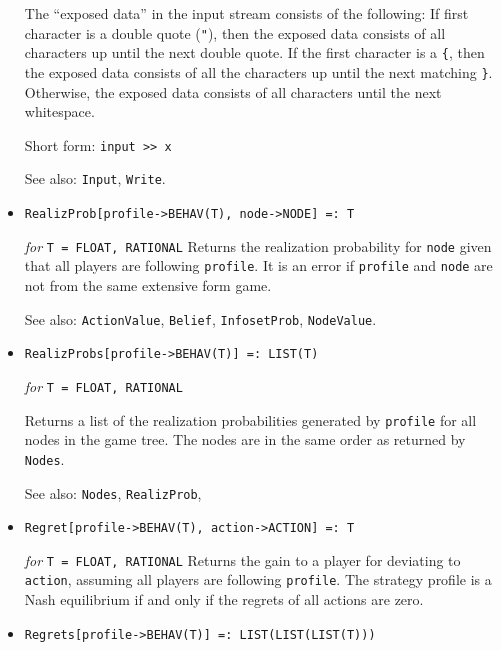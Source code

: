 \begin{itemize}
The ``exposed data'' in the input stream consists of the following: If
first character is a double quote (\verb+"+), then the exposed data
consists of all characters up until the next double quote.  If the
first character is a \verb+{+, then the exposed data consists of all
the characters up until the next matching \verb+}+.  Otherwise, the
exposed data consists of all characters until the next whitespace.
\item [Short form:] \verb+input >> x+
\item [See also:] \verb+Input+, \verb+Write+.
\ed

\item{}
\protect \large \begin{verbatim}
RealizProb[profile->BEHAV(T), node->NODE] =: T
\end{verbatim}\normalsize

{\it for} {\tt T = FLOAT, RATIONAL}
\bd
Returns the realization probability for \verb+node+ given that all players
are following \verb+profile+.  It is an error if \verb+profile+ and
\verb+node+ are not from the same extensive form game.
\item [See also:] \verb+ActionValue+, \verb+Belief+, \verb+InfosetProb+,
\verb+NodeValue+.
\ed

\item{}
\protect \large \begin{verbatim}
RealizProbs[profile->BEHAV(T)] =: LIST(T)
\end{verbatim}\normalsize

{\it for} {\tt T = FLOAT, RATIONAL}
\bd

Returns a list of the realization probabilities generated by
\verb+profile+ for all nodes in the game tree.  The nodes are in the
same order as returned by \verb+Nodes+.
\item [See also:] \verb+Nodes+, \verb+RealizProb+, 
\ed

\item{}
\protect \large \begin{verbatim}
Regret[profile->BEHAV(T), action->ACTION] =: T
\end{verbatim} \normalsize

{\it for} {\tt T = FLOAT, RATIONAL}
\bd
Returns the gain to a player for deviating to \verb+action+, assuming
all players are following \verb+profile+.  The strategy profile is
a Nash equilibrium if and only if the regrets of all actions are zero.
\ed

\item{}
\protect \large \begin{verbatim}
Regrets[profile->BEHAV(T)] =: LIST(LIST(LIST(T)))
\end{verbatim} \normalsize


\end{itemize}
